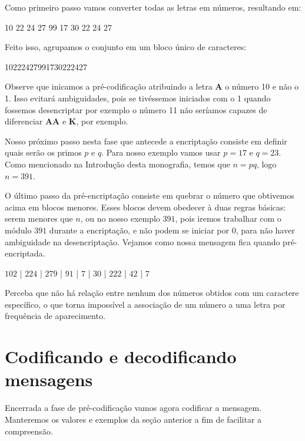 Como primeiro passo vamos converter todas as letras em n\'umeros, resultando em:
 
\begin{center}
10 22 24 27 99 17 30 22 24 27
\end{center}

Feito isso, agrupamos o conjunto em um bloco \'unico de caracteres:

\begin{center}
10222427991730222427
\end{center}

Observe que inicamos a pré-codificação atribuindo a letra \textbf{A} o número 10 e não o 1. Isso evitará ambiguidades, pois se tivéssemos iniciados com o 1 quando fossemos desencriptar por exemplo o número 11 não seríamos capazes de diferenciar \textbf{AA} e \textbf{K}, por exemplo.

Nosso pr\'oximo passo nesta fase que antecede a encripta\c{c}\~ao consiste em definir quais ser\~ao os primos $p$ e $q$. Para nosso exemplo vamos usar $p=17$ e $q=23$. Como mencionado na Introdu\c{c}\~ao desta monografia, temos que $n = pq$, logo $n=391$.

O \'ultimo passo da pr\'e-encripta\c{c}\~ao consiste em quebrar o n\'umero que obtivemos acima em blocos menores. Esses blocos devem obedecer \`a duas regras b\'asicas: serem menores que $n$, ou no nosso exemplo $391$, pois iremos trabalhar com  o m\'odulo $391$ durante a encripta\c{c}\~ao, e n\~ao podem se iniciar por $0$, para n\~ao haver ambiguidade na desencripta\c{c}\~ao. Vejamos como nossa mensagem fica quando pr\'e-encriptada.

\begin{center}
$102$ | $224$ | $279$ | $91$ | $7$ | $30$ | $222$ | $42$ | $7$
\end{center}

Perceba que n\~ao h\'a rela\c{c}\~ao entre nenhum dos n\'umeros obtidos com um caractere espec\'ifico, o que torna imposs\'ivel a associa\c{c}\~ao de um n\'umero a uma letra por frequ\^encia de aparecimento. 

\section{Codificando e decodificando mensagens}

Encerrada a fase de pr\'e-codifica\c{c}\~ao vamos agora codificar a mensagem. Manteremos os valores e exemplos da se\c{c}\~ao anterior a fim de facilitar a compreens\~ao.

